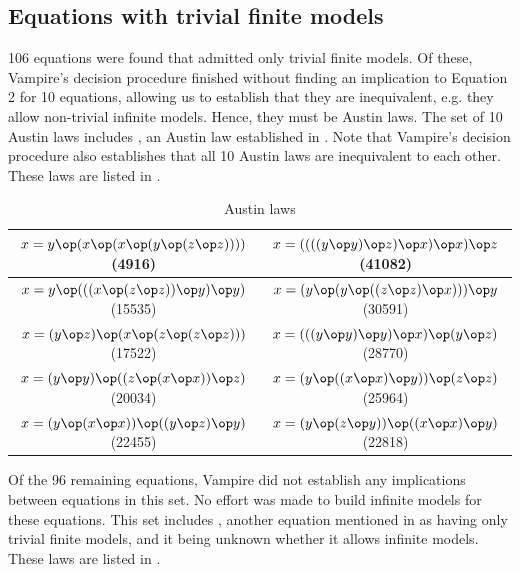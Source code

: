 \subsection{Equations with trivial finite models}

106 equations were found that admitted only trivial finite models. Of these, Vampire's decision procedure finished without finding an implication to Equation 2 for 10 equations, allowing us to establish that they are inequivalent, e.g. they allow non-trivial infinite models.
Hence, they must be Austin laws.
The set of 10 Austin laws includes , an Austin law established in \cite{Kisielewicz2}.
Note that Vampire's decision procedure also establishes that all 10 Austin laws are inequivalent to each other.
These laws are listed in .

\begin{table}[h]
\begin{tabular}{|c|c|}
\hline
$x = y \op (x \op (x \op (y \op (z \op z))))$ (4916) & $x = ((((y \op y) \op z) \op x) \op x) \op z$ (41082) \\ \hline
$x = y \op (((x \op (z \op z)) \op y) \op y)$ (15535) & $x = (y \op (y \op ((z \op z) \op x))) \op y$ (30591) \\ \hline
$x = (y \op z) \op (x \op (z \op (z \op z)))$ (17522) & $x = (((y \op y) \op y) \op x) \op (y \op z)$ (28770) \\ \hline
$x = (y \op y) \op ((z \op (x \op x)) \op z)$ (20034) & $x = (y \op ((x \op x) \op y)) \op (z \op z)$ (25964) \\ \hline
$x = (y \op (x \op x)) \op ((y \op z) \op y)$ (22455) & $x = (y \op (z \op y)) \op ((x \op x) \op y)$ (22818) \\ \hline
\end{tabular}
\caption{Austin laws}
\label{table1}
\end{table}

Of the 96 remaining equations, Vampire did not establish any implications between equations in this set. No effort was made to build infinite models for these equations.
This set includes , another equation mentioned in \cite{Kisielewicz2} as having only trivial finite models, and it being unknown whether it allows infinite models.
These laws are listed in .

